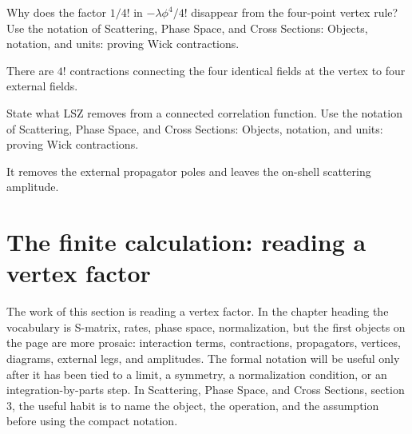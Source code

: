 \begin{exercise}
Why does the factor \(1/4!\) in \(-\lambda\phi^4/4!\) disappear from the four-point vertex rule?  Use the notation of Scattering, Phase Space, and Cross Sections: Objects, notation, and units: proving Wick contractions.
\begin{answer}
There are \(4!\) contractions connecting the four identical fields at the vertex to four external fields.
\end{answer}
\end{exercise}

\begin{exercise}
State what LSZ removes from a connected correlation function.  Use the notation of Scattering, Phase Space, and Cross Sections: Objects, notation, and units: proving Wick contractions.
\begin{answer}
It removes the external propagator poles and leaves the on-shell scattering amplitude.
\end{answer}
\end{exercise}



\section{The finite calculation: reading a vertex factor}













The work of this section is reading a vertex factor.  In the chapter heading the vocabulary is S-matrix, rates, phase space, normalization, but the first objects on the page are more prosaic: interaction terms, contractions, propagators, vertices, diagrams, external legs, and amplitudes.  The formal notation will be useful only after it has been tied to a limit, a symmetry, a normalization condition, or an integration-by-parts step.  In Scattering, Phase Space, and Cross Sections, section 3, the useful habit is to name the object, the operation, and the assumption before using the compact notation.

